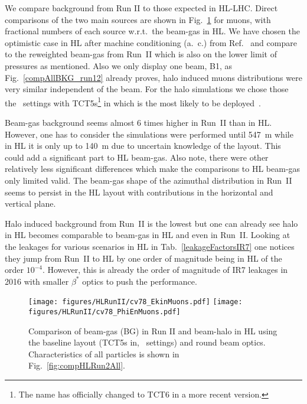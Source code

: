 We compare background from Run II to those expected in HL-LHC. Direct comparisons of the two main sources are shown in Fig.~\ref{fig:HLR2Muons} for muons, with fractional numbers of each source w.r.t.~the beam-gas in HL. We have chosen the optimistic case in HL after machine conditioning (a.~c.) from Ref.~\cite{ipac2015_rkh} and compare to the reweighted beam-gas from Run~II which is also on the lower limit of pressures as mentioned. Also we only display one beam, B1, as Fig.~\ref{compAllBKG_run12} already proves, halo induced muons distributions were very similar independent of the beam. For the halo simulations we chose those the \twosigmaret~settings with TCT5s\footnote{The name has officially changed to TCT6 in a more recent version.} in which is the most likely to be deployed~\cite{layoutProcRod}.

Beam-gas background seems almost 6 times higher in Run~II than in HL. However, one has to consider the simulations were performed until 547~m while in HL it is only up to 140~m due to uncertain knowledge of the layout. This could add a significant part to HL beam-gas. Also note, there were other relatively less significant differences which make the comparisons to HL beam-gas only limited valid. The beam-gas shape of the azimuthal distribution in Run~II seems to persist in the HL layout with contributions in the horizontal and vertical plane.


Halo induced background from Run~II is the lowest but one can already see halo in HL becomes comparable to beam-gas in HL and even in Run~II. Looking at the leakages for various scenarios in HL in Tab.~\ref{leakageFactorsIR7} one notices they jump from Run~II to HL by one order of magnitude being in HL of the order $10^{-4}$. However, this is already the order of magnitude of IR7 leakages in 2016 with smaller $\beta^*$ optics to push the performance.


\begin{figure}
\begin{center}
  \texttt{[image: figures/HLRunII/cv78\_EkinMuons.pdf]}
  \texttt{[image: figures/HLRunII/cv78\_PhiEnMuons.pdf]}
\end{center}
\vspace{-0.6cm}
 \caption{Comparison of beam-gas (BG) in Run II and beam-halo in HL using the baseline layout (TCT5s in, \twosigmaret~settings) and round beam optics. Characteristics of all particles is shown in Fig.~\ref{fig:compHLRun2All}.
  \label{fig:HLR2Muons}}
\end{figure}
